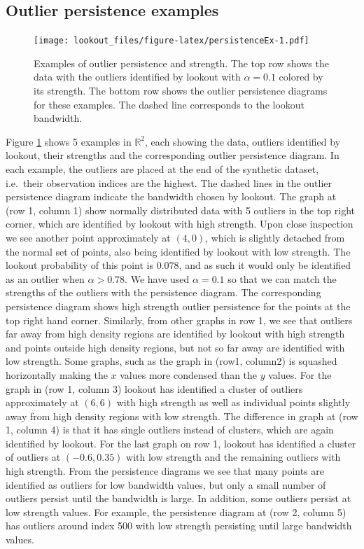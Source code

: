 \documentclass[11pt,a4paper,]{article}
\theoremstyle{definition}
\theoremstyle{definition}
\theoremstyle{definition}
\theoremstyle{remark}
\begin{document}
\hypertarget{sec:PersistenceExamples}{%
\subsection{Outlier persistence examples}\label{sec:PersistenceExamples}}

\begin{figure}
\centering
\texttt{[image: lookout\_files/figure-latex/persistenceEx-1.pdf]}
\caption{\label{fig:persistenceEx}Examples of outlier persistence and strength. The top row shows the data with the outliers identified by lookout with \(\alpha = 0.1\) colored by its strength. The bottom row shows the outlier persistence diagrams for these examples. The dashed line corresponds to the lookout bandwidth.}
\end{figure}

Figure \ref{fig:persistenceEx} shows 5 examples in \(\mathbb{R}^2\), each showing the data, outliers identified by lookout, their strengths and the corresponding outlier persistence diagram. In each example, the outliers are placed at the end of the synthetic dataset, i.e.~their observation indices are the highest. The dashed lines in the outlier persistence diagram indicate the bandwidth chosen by lookout. The graph at (row 1, column 1) show normally distributed data with 5 outliers in the top right corner, which are identified by lookout with high strength. Upon close inspection we see another point approximately at \((4,0)\), which is slightly detached from the normal set of points, also being identified by lookout with low strength. The lookout probability of this point is \(0.078\), and as such it would only be identified as an outlier when \(\alpha > 0.78\). We have used \(\alpha = 0.1\) so that we can match the strengths of the outliers with the persistence diagram. The corresponding persistence diagram shows high strength outlier persistence for the points at the top right hand corner. Similarly, from other graphs in row 1, we see that outliers far away from high density regions are identified by lookout with high strength and points outside high density regions, but not so far away are identified with low strength. Some graphs, such as the graph in (row1, column2) is squashed horizontally making the \(x\) values more condensed than the \(y\) values. For the graph in (row 1, column 3) lookout has identified a cluster of outliers approximately at \((6,6)\) with high strength as well as individual points slightly away from high density regions with low strength. The difference in graph at (row 1, column 4) is that it has single outliers instead of clusters, which are again identified by lookout. For the last graph on row 1, lookout has identified a cluster of outliers at \((-0.6, 0.35)\) with low strength and the remaining outliers with high strength. From the persistence diagrams we see that many points are identified as outliers for low bandwidth values, but only a small number of outliers persist until the bandwidth is large. In addition, some outliers persist at low strength values. For example, the persistence diagram at (row 2, column 5) has outliers around index 500 with low strength persisting until large bandwidth values.
\end{document}
